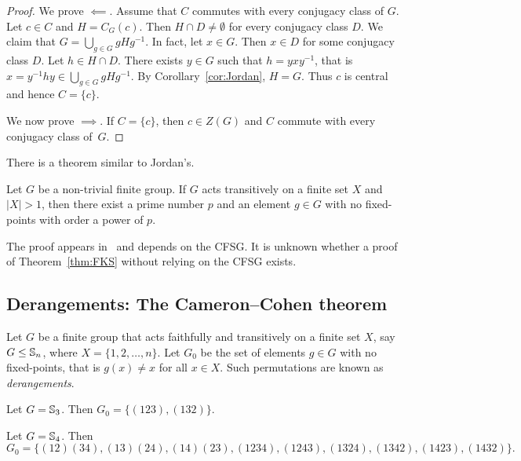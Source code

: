 \begin{proof}
    We prove $\impliedby$. 
    Assume that $C$ commutes with every conjugacy class of $G$. 
    Let $c\in C$ and $H=C_G(c)$. Then $H\cap D\ne\emptyset$ for every conjugacy class
    $D$. We claim that $G=\bigcup_{g\in G}gHg^{-1}$. In fact, let $x\in G$. Then
    $x\in D$ 
    for some conjugacy class $D$. 
    Let 
    $h\in H\cap D$. There exists $y\in G$ such that $h=yxy^{-1}$, that is
    $x=y^{-1}hy\in \bigcup_{g\in G}gHg^{-1}$. By Corollary~\ref{cor:Jordan},  
    $H=G$. Thus $c$ is central and hence $C=\{c\}$. 
    
    We now prove $\implies$. If $C=\{c\}$, then $c\in Z(G)$ and $C$ commute with every 
    conjugacy class of~$G$. 
\end{proof}

\begin{optional}

There is a theorem similar to Jordan’s.

\begin{theorem}
    \label{thm:FKS}
    Let $G$ be a non-trivial finite group. If $G$ acts transitively
    on a finite set $X$ and $|X|>1$, then
    there exist a prime number $p$ and an element $g\in G$ with no fixed-points
    with order a power of $p$.
\end{theorem}

The proof appears in~\cite{MR636194} and depends on the CFSG. It is unknown whether a proof of Theorem~\ref{thm:FKS} without relying on the CFSG exists.
\end{optional}

\subsection{Derangements: The Cameron--Cohen theorem}

Let $G$ be a finite group that acts faithfully and transitively 
on a finite set $X$, say 
$G\leq\mathbb{S}_n$, where $X=\{1,2,\dots,n\}$. Let 
$G_0$ be the set of elements $g\in G$ with no fixed-points, 
that is $g(x)\ne x$ for all $x\in X$. 
Such permutations are known as \emph{derangements}. 

\begin{example}
Let $G=\mathbb{S}_3$. Then $G_0=\{(123),(132)\}$.
\end{example}

\begin{example}
Let $G=\mathbb{S}_4$. Then 
    \[
    G_0=\{(12)(34),(13)(24),(14)(23),(1234),(1243),(1324),(1342),(1423),(1432)\}.
    \]
\end{example}

